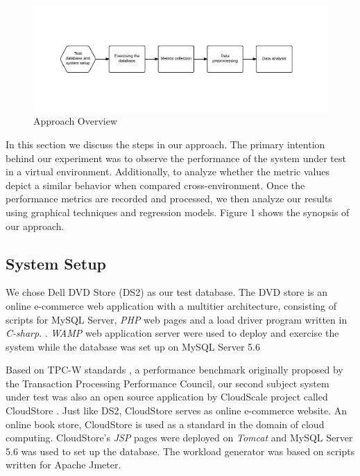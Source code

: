 
\begin{figure}[!t]
	\centering
	\includegraphics[width=\textwidth]{approach.pdf}
	\caption{Approach Overview}
	\captionsetup{justification=centering}
	\label{fig:Approach}
	
\end{figure}

In this section we discuss the steps in our approach. The primary intention behind our experiment was to observe the performance of the system under test in a virtual environment. Additionally, to analyze whether the metric values depict a similar behavior when compared cross-environment. Once the performance metrics are recorded and processed, we then analyze our results using graphical techniques and regression models. Figure 1 shows the synopsis of our approach.


\subsection{System Setup}
We chose Dell DVD Store (DS2) \cite{delldvd} as our test database. The DVD store is an online e-commerce web application with a multitier architecture, consisting of scripts for MySQL Server, \textit{PHP} web pages and a load driver program written in \textit{C-sharp}. \cite{Shang:2015:ADP:2668930.2688052} \cite{Nguyen:2012:ADP:2188286.2188344} \cite{Nguyen:2012:ADP:2188286.2188344}. \textit{WAMP} \cite{wamp} web application server were used to deploy and exercise the system while the database was set up on MySQL Server 5.6 \cite{mysql}

Based on TPC-W standards \cite{tpcw}, a performance benchmark originally proposed by the Transaction Processing Performance Council, our second subject system under test was also an open source application by CloudScale project \cite{cloudscaleproject} called CloudStore \cite{cloudstore}. Just like DS2, CloudStore serves as online e-commerce website. An online book store, CloudStore is used as a standard in the domain of cloud computing. CloudStore's \textit{JSP} pages were deployed on \textit{Tomcat} \cite{tomcat} and MySQL Server 5.6 \cite{mysql} was used to set up the database. The workload generator was based on scripts written for Apache Jmeter. \cite{apachejmeter}

